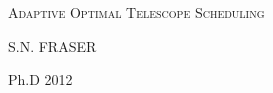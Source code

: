 \documentclass[12pt,a4paper]{article}
\begin{document}
\setlength{\parindent}{5mm}
\setlength{\parskip}{10pt plus2mm minus2mm}
\thispagestyle{empty}



\begin{titlepage}
 
\begin{center}

\textsc{\LARGE Adaptive Optimal Telescope Scheduling}\\[1.5cm]
  
\vfill

\Large{S.N. FRASER}

\vfill
 
\Large{Ph.D} \hfill \Large{2012}

\end{center}
 
\end{titlepage}
\end{document}
